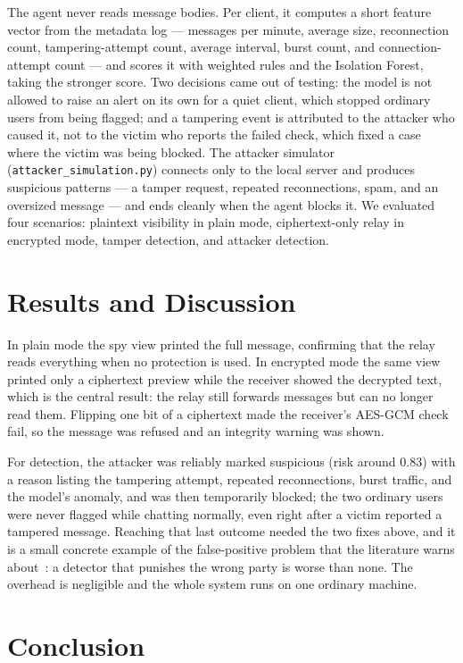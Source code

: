 \documentclass[onecolumn]{article}
\begin{document}
The agent never reads message bodies. Per client, it computes a short feature vector from the metadata log --- messages per minute, average size, reconnection count, tampering-attempt count, average interval, burst count, and connection-attempt count --- and scores it with weighted rules and the Isolation Forest, taking the stronger score. Two decisions came out of testing: the model is not allowed to raise an alert on its own for a quiet client, which stopped ordinary users from being flagged; and a tampering event is attributed to the attacker who caused it, not to the victim who reports the failed check, which fixed a case where the victim was being blocked. The attacker simulator (\texttt{attacker\_simulation.py}) connects only to the local server and produces suspicious patterns --- a tamper request, repeated reconnections, spam, and an oversized message --- and ends cleanly when the agent blocks it. We evaluated four scenarios: plaintext visibility in plain mode, ciphertext-only relay in encrypted mode, tamper detection, and attacker detection.

\section{Results and Discussion}
\label{sec:results}

In plain mode the spy view printed the full message, confirming that the relay reads everything when no protection is used. In encrypted mode the same view printed only a ciphertext preview while the receiver showed the decrypted text, which is the central result: the relay still forwards messages but can no longer read them. Flipping one bit of a ciphertext made the receiver's AES-GCM check fail, so the message was refused and an integrity warning was shown.

For detection, the attacker was reliably marked suspicious (risk around 0.83) with a reason listing the tampering attempt, repeated reconnections, burst traffic, and the model's anomaly, and was then temporarily blocked; the two ordinary users were never flagged while chatting normally, even right after a victim reported a tampered message. Reaching that last outcome needed the two fixes above, and it is a small concrete example of the false-positive problem that the literature warns about~\cite{c13}: a detector that punishes the wrong party is worse than none. The overhead is negligible and the whole system runs on one ordinary machine.

\section{Conclusion}
\label{sec:conclusion}
\end{document}
